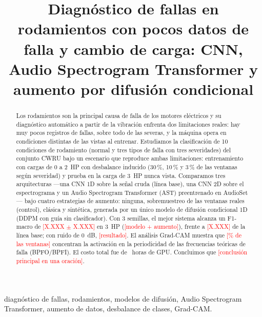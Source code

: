 \documentclass[conference]{IEEEtran}
\newcommand{\pend}[1]{\textcolor{red}{[#1]}}
\begin{document}
\title{Diagnóstico de fallas en rodamientos con pocos datos de falla y cambio de carga: CNN, Audio Spectrogram Transformer y aumento por difusión condicional}

\author{
}

\maketitle

\begin{abstract}
Los rodamientos son la principal causa de falla de los motores eléctricos y su diagnóstico automático a partir de la vibración enfrenta dos limitaciones reales: hay muy pocos registros de fallas, sobre todo de las severas, y la máquina opera en condiciones distintas de las vistas al entrenar. Estudiamos la clasificación de 10 condiciones de rodamiento (normal y tres tipos de falla con tres severidades) del conjunto CWRU bajo un escenario que reproduce ambas limitaciones: entrenamiento con cargas de 0 a 2~HP con desbalance inducido (30\,\%, 10\,\% y 3\,\% de las ventanas según severidad) y prueba en la carga de 3~HP nunca vista. Comparamos tres arquitecturas ---una CNN 1D sobre la señal cruda (línea base), una CNN 2D sobre el espectrograma y un Audio Spectrogram Transformer (AST) preentrenado en AudioSet--- bajo cuatro estrategias de aumento: ninguna, sobremuestreo de las ventanas reales (control), clásica y sintética, generada por un único modelo de difusión condicional 1D (DDPM con guía sin clasificador). Con 3 semillas, el mejor sistema alcanza un F1-macro de \pend{X.XXX $\pm$ X.XXX} en 3~HP (\pend{modelo + aumento}), frente a \pend{X.XXX} de la línea base; con ruido de 0~dB, \pend{resultado}. El análisis Grad-CAM muestra que \pend{\% de las ventanas} concentran la activación en la periodicidad de las frecuencias teóricas de falla (BPFO/BPFI). El costo total fue de \GPUH~horas de GPU. Concluimos que \pend{conclusión principal en una oración}.
\end{abstract}

\begin{IEEEkeywords}
diagnóstico de fallas, rodamientos, modelos de difusión, Audio Spectrogram Transformer, aumento de datos, desbalance de clases, Grad-CAM.
\end{IEEEkeywords}
\end{document}
